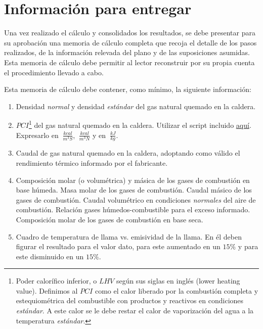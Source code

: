 \newpage
\section{Información para entregar}\label{sec:Info}

Una vez realizado el cálculo y consolidados los resultados, se debe presentar para su aprobación una memoria de cálculo completa que recoja el detalle de los pasos realizados, de la información relevada del plano y de las suposiciones asumidas. Esta memoria de cálculo debe permitir al lector reconstruir por su propia cuenta el procedimiento llevado a cabo.

Esta memoria de cálculo debe contener, como mínimo, la siguiente información:

\begin{enumerate}
    
    \item Densidad \textit{normal} y densidad \textit{estándar} del gas natural quemado en la caldera.
    
    \item $PCI$\footnote{Poder calorífico inferior, o $LHV$ según sus siglas en inglés (lower heating value). Definimos al $PCI$ como el calor liberado por la combustión completa y estequiométrica del combustible con productos y reactivos en condiciones \textit{estándar}. A este calor se le debe restar el calor de vaporización del agua a la temperatura \textit{estándar}.} del gas natural quemado en la caldera. Utilizar el script incluido \href{https://www.unitrove.com/engineering/tools/gas/natural-gas-calorific-value}{aquí}. Expresarlo en $\SI{}{\frac{kcal}{m^3S}}$, $\SI{}{\frac{kcal}{m^3N}}$ y en $\SI{}{\frac{kJ}{kg}}$.
    
    \item Caudal de gas natural quemado en la caldera, adoptando como válido el rendimiento térmico informado por el fabricante.
    
    \item Composición molar (o volumétrica) y másica de los gases de combustión en base húmeda. Masa molar de los gases de combustión. Caudal másico de los gases de combustión. Caudal volumétrico en condiciones \textit{normales} del aire de combustión. Relación gases húmedos-combustible para el exceso informado. Composición molar de los gases de combustión en base seca.
    
    \item Cuadro de temperatura de llama vs. emisividad de la llama. En él deben figurar el resultado para el valor dato, para este aumentado en un $15\%$ y para este disminuido en un $15\%$.
    

\end{enumerate}
